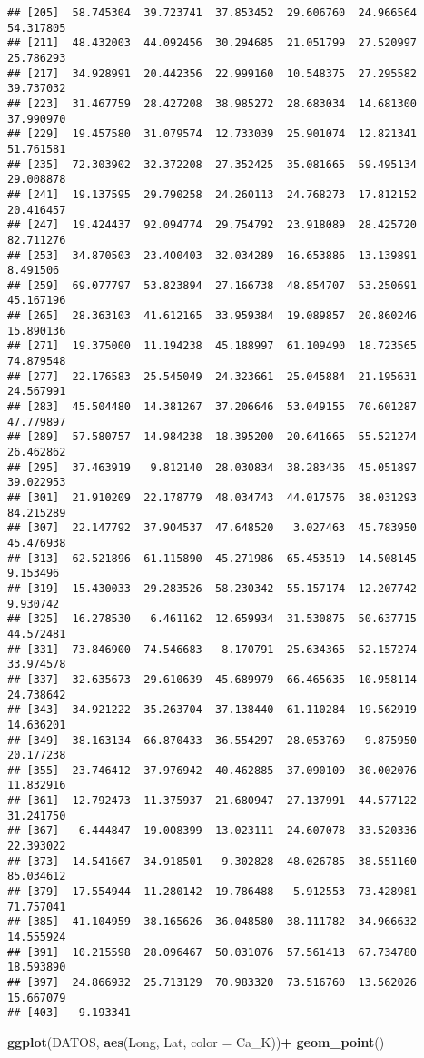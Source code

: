 \documentclass[
]{article}
\newenvironment{Shaded}{\begin{snugshade}}{\end{snugshade}}
\newcommand{\DataTypeTok}[1]{\textcolor[rgb]{0.13,0.29,0.53}{#1}}
\newcommand{\KeywordTok}[1]{\textcolor[rgb]{0.13,0.29,0.53}{\textbf{#1}}}
\newcommand{\NormalTok}[1]{#1}
\newcommand{\OperatorTok}[1]{\textcolor[rgb]{0.81,0.36,0.00}{\textbf{#1}}}
\newcommand{\StringTok}[1]{\textcolor[rgb]{0.31,0.60,0.02}{#1}}
\begin{document}
\begin{verbatim}
## [205]  58.745304  39.723741  37.853452  29.606760  24.966564  54.317805
## [211]  48.432003  44.092456  30.294685  21.051799  27.520997  25.786293
## [217]  34.928991  20.442356  22.999160  10.548375  27.295582  39.737032
## [223]  31.467759  28.427208  38.985272  28.683034  14.681300  37.990970
## [229]  19.457580  31.079574  12.733039  25.901074  12.821341  51.761581
## [235]  72.303902  32.372208  27.352425  35.081665  59.495134  29.008878
## [241]  19.137595  29.790258  24.260113  24.768273  17.812152  20.416457
## [247]  19.424437  92.094774  29.754792  23.918089  28.425720  82.711276
## [253]  34.870503  23.400403  32.034289  16.653886  13.139891   8.491506
## [259]  69.077797  53.823894  27.166738  48.854707  53.250691  45.167196
## [265]  28.363103  41.612165  33.959384  19.089857  20.860246  15.890136
## [271]  19.375000  11.194238  45.188997  61.109490  18.723565  74.879548
## [277]  22.176583  25.545049  24.323661  25.045884  21.195631  24.567991
## [283]  45.504480  14.381267  37.206646  53.049155  70.601287  47.779897
## [289]  57.580757  14.984238  18.395200  20.641665  55.521274  26.462862
## [295]  37.463919   9.812140  28.030834  38.283436  45.051897  39.022953
## [301]  21.910209  22.178779  48.034743  44.017576  38.031293  84.215289
## [307]  22.147792  37.904537  47.648520   3.027463  45.783950  45.476938
## [313]  62.521896  61.115890  45.271986  65.453519  14.508145   9.153496
## [319]  15.430033  29.283526  58.230342  55.157174  12.207742   9.930742
## [325]  16.278530   6.461162  12.659934  31.530875  50.637715  44.572481
## [331]  73.846900  74.546683   8.170791  25.634365  52.157274  33.974578
## [337]  32.635673  29.610639  45.689979  66.465635  10.958114  24.738642
## [343]  34.921222  35.263704  37.138440  61.110284  19.562919  14.636201
## [349]  38.163134  66.870433  36.554297  28.053769   9.875950  20.177238
## [355]  23.746412  37.976942  40.462885  37.090109  30.002076  11.832916
## [361]  12.792473  11.375937  21.680947  27.137991  44.577122  31.241750
## [367]   6.444847  19.008399  13.023111  24.607078  33.520336  22.393022
## [373]  14.541667  34.918501   9.302828  48.026785  38.551160  85.034612
## [379]  17.554944  11.280142  19.786488   5.912553  73.428981  71.757041
## [385]  41.104959  38.165626  36.048580  38.111782  34.966632  14.555924
## [391]  10.215598  28.096467  50.031076  57.561413  67.734780  18.593890
## [397]  24.866932  25.713129  70.983320  73.516760  13.562026  15.667079
## [403]   9.193341
\end{verbatim}

\begin{Shaded}
\begin{Highlighting}[]
\KeywordTok{ggplot}\NormalTok{(DATOS, }\KeywordTok{aes}\NormalTok{(Long, Lat, }\DataTypeTok{color =}\NormalTok{ Ca_K))}\OperatorTok{+}
\StringTok{  }\KeywordTok{geom_point}\NormalTok{()}
\end{Highlighting}
\end{Shaded}
\end{document}
